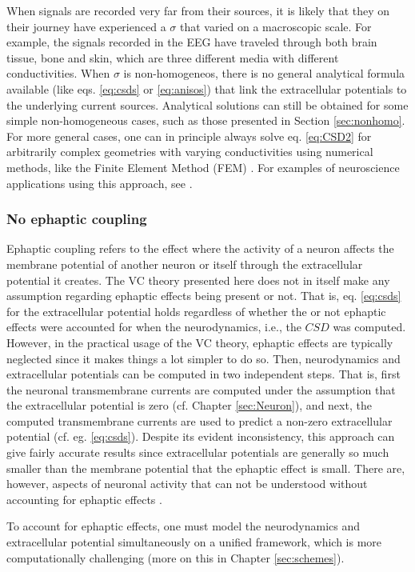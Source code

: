 When signals are recorded very far from their sources, it is likely that they on their journey have experienced a $\sigma$ that varied on a macroscopic scale. For example, the signals recorded in the EEG have traveled through both brain tissue, bone and skin, which are three different media with different conductivities. When $\sigma$ is non-homogeneos, there is no general analytical formula available (like eqs. \ref{eq:csds} or \ref{eq:anisos}) that link the extracellular potentials to the underlying current sources. Analytical solutions can still be obtained for some simple non-homogeneous cases, such as those presented in Section \ref{sec:nonhomo}. For more general cases, one can in principle always solve eq. \ref{eq:CSD2} for arbitrarily complex geometries with varying conductivities using numerical methods, like the Finite Element Method (FEM) \citep{Logg2012}. For examples of neuroscience applications using this approach, see \cite{Moffitt2005, Frey2009, Joucla2012, Haufe2015, Ness2015, Buccino2019b, Obien2019}. 





\subsubsection{No ephaptic coupling} 
Ephaptic coupling refers to the effect where the activity of a neuron affects the membrane potential of another neuron or itself through the extracellular potential it creates. The VC theory presented here does not in itself make any assumption regarding ephaptic effects being present or not. That is, eq. \ref{eq:csds} for the extracellular potential holds regardless of whether the or not ephaptic effects were accounted for when the neurodynamics, i.e., the $CSD$ was computed. However, in the practical usage of the VC theory, ephaptic effects are typically neglected since it makes things a lot simpler to do so. Then, neurodynamics and extracellular potentials can be computed in two independent steps. That is, first the neuronal transmembrane currents are computed under the assumption that the extracellular potential is zero (cf. Chapter \ref{sec:Neuron}), and next, the computed transmembrane currents are used to predict a non-zero extracellular potential (cf. eg. \ref{eq:csds}). Despite its evident inconsistency, this approach can give fairly accurate results since extracellular potentials are generally so much smaller than the membrane potential that the ephaptic effect is small. There are, however, aspects of neuronal activity that can not be understood without accounting for ephaptic effects \cite{Holt1999, Anastassiou2015, Goldwyn2016}. 

To account for ephaptic effects, one must model the neurodynamics and extracellular potential simultaneously on a unified framework, which is more computationally challenging (more on this in Chapter \ref{sec:schemes}).



